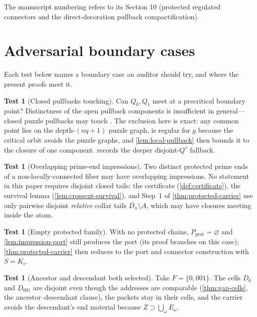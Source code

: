 \documentclass[11pt,reqno]{amsart}
\numberwithin{equation}{section}
\theoremstyle{plain}
\theoremstyle{definition}
\newtheorem{test}[theorem]{Test}
\theoremstyle{remark}
\newcommand{\rootK}{K_{\epsilon}}
\begin{document}
The manuscript numbering refers to its Section 10 (protected regulated
connectors and the direct-decoration pullback compactification).

\section{Adversarial boundary cases}
\label{app:tests}

Each test below names a boundary case an auditor should try, and where
the present proofs meet it.

\begin{test}[Closed pullbacks touching]
\label{test:touching}
Can $Q_0,Q_1$ meet at a precritical boundary point?  Distinctness of
the open pullback components is insufficient in general---closed puzzle
pullbacks may touch \cite{KLDecorations08}.  The exclusion here is
exact: any common point lies on the depth-$(nq+1)$ puzzle graph, is
regular for $g$ because the critical orbit avoids the puzzle graphs,
and \cref{lem:local-pullback} then bounds it to the closure of one
component.   records the deeper disjoint-$Q^v$
fallback.
\end{test}

\begin{test}[Overlapping prime-end impressions]
\label{test:impressions}
Two distinct protected prime ends of a non-locally-connected fiber may
have overlapping impressions.  No statement in this paper requires
disjoint closed tails: the certificate
(\cref{def:certificate}), the survival lemma
(\cref{lem:crosscut-survival}), and Step~1 of
\cref{thm:protected-carrier} use only pairwise disjoint
\emph{relative} collar tails $\overline{D_n}\setminus A$, which may
have closures meeting inside the atom.
\end{test}

\begin{test}[Empty protected family]
\label{test:empty}
With no protected chains, $P_{\mathrm{prot}}=\varnothing$ and
\cref{lem:impression-port} still produces the port (its proof branches
on this case); \cref{thm:protected-carrier} then reduces to the port
and connector construction with $S=\rootK$.
\end{test}

\begin{test}[Ancestor and descendant both selected]
\label{test:ancestor}
Take $F=\{0,001\}$.  The cells $D_0$ and $D_{001}$ are disjoint even
though the addresses are comparable (\cref{thm:gap-cells}, the
ancestor--descendant clause), the packets stay in their cells, and the
carrier avoids the descendant's end material because
$Z\supset\bigcup_\omega E_\omega$.
\end{test}
\end{document}
